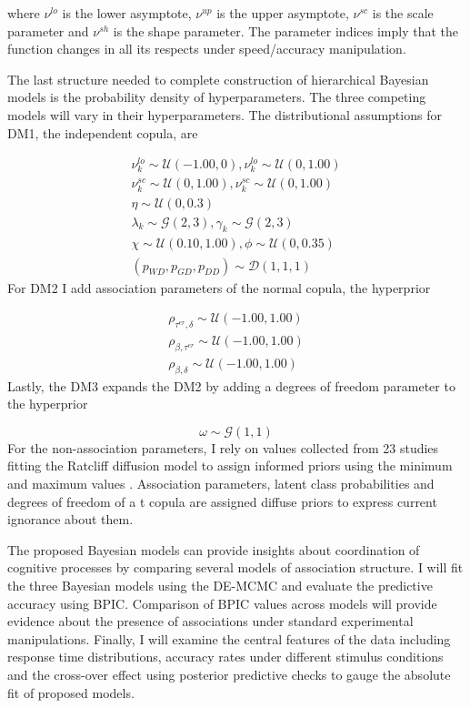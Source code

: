 \documentclass[12pt]{article}
\begin{document}
\noindent where $\nu^{lo}$ is the lower asymptote, $\nu^{up}$ is the upper asymptote, $\nu^{sc}$ is the scale parameter and $\nu^{sh}$ is the shape parameter. The parameter indices imply that the function changes in all its respects under speed/accuracy manipulation.

	The last structure needed to complete construction of hierarchical Bayesian models is the probability density of hyperparameters. The three competing models will vary in their hyperparameters. The distributional assumptions for DM1, the independent copula, are
    
\begin{gather}
\nu_k^{lo} \sim \mathcal{U}(-1.00, 0), \nu_k^{lo} \sim \mathcal{U}(0, 1.00) \nonumber \\
\nu_k^{sc} \sim \mathcal{U}(0, 1.00), \nu_k^{sc} \sim \mathcal{U}(0, 1.00) \nonumber \\
\eta \sim \mathcal{U}(0, 0.3) \nonumber \\
\lambda_k \sim \mathcal{G}(2, 3), \gamma_k \sim \mathcal{G}(2, 3) \nonumber \\
\chi \sim \mathcal{U}(0.10, 1.00), \phi \sim \mathcal{U}(0, 0.35) \nonumber \\
(p_{WD}, p_{GD}, p_{DD}) \sim \mathcal{D}(1, 1, 1) 
\end{gather}
For DM2 I add association parameters of the normal copula, the hyperprior 

\begin{eqnarray}
\rho_{\tau^{er},\delta} \sim \mathcal{U}(-1.00, 1.00) \nonumber \\
\rho_{\beta,\tau^{er}} \sim \mathcal{U}(-1.00, 1.00) \nonumber \\
\rho_{\beta,\delta} \sim \mathcal{U}(-1.00, 1.00) 
\end{eqnarray}
Lastly, the DM3 expands the DM2 by adding a degrees of freedom parameter to the hyperprior

\begin{equation}
\omega \sim \mathcal{G}(1, 1)
\end{equation}
For the non-association parameters, I rely on values collected from 23 studies fitting the Ratcliff diffusion model to assign informed priors using the minimum and maximum values \citep{MatWag2009}. Association parameters, latent class probabilities and degrees of freedom of a t copula are assigned diffuse priors to express current ignorance about them.

	The proposed Bayesian models can provide insights about coordination of cognitive processes by comparing several models of association structure. I will fit the three Bayesian models using the DE-MCMC and evaluate the predictive accuracy using BPIC. Comparison of BPIC values across models will provide evidence about the presence of associations under standard experimental manipulations. Finally, I will examine the central features of the data including response time distributions, accuracy rates under different stimulus conditions and the cross-over effect using posterior predictive checks to gauge the absolute fit of proposed models.




\end{document}
